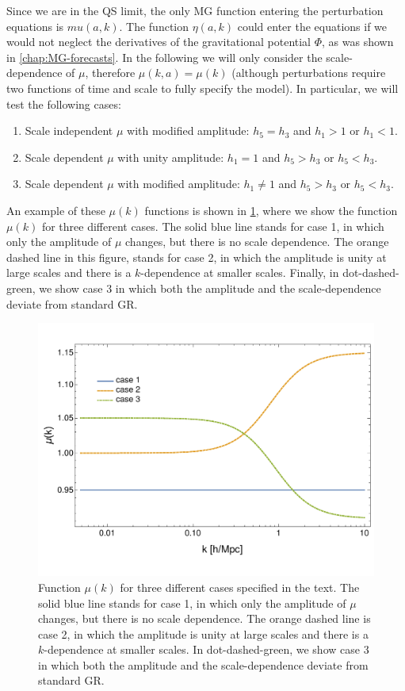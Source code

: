 Since we are in the QS limit, the only MG function entering the perturbation equations
is $mu(a,k)$. The function $\eta(a,k)$ could enter the equations
if we would not neglect the derivatives of the gravitational potential $\Phi$, as 
was shown in \cref{chap:MG-forecasts}.
In the following we will only consider the scale-dependence of $\mu$, therefore $\mu(k,a)=\mu(k)$ (although perturbations require
two functions of time and scale to fully specify the model). In particular,
we will test the following cases: 
\begin{enumerate} \label{enum:enumeration-cases}
	\item Scale independent $\mu$ with modified amplitude: $h_{5}=h_{3}$ and
	$h_{1}>1$ or $h_{1}<1$. 
	\item Scale dependent $\mu$ with unity amplitude: $h_{1}=1$ and $h_{5}>h_{3}$
	or $h_{5}<h_{3}$. 
	\item Scale dependent $\mu$ with modified amplitude: $h_{1}\neq1$ and
	$h_{5}>h_{3}\mbox{ or }h_{5}<h_{3}$. 
\end{enumerate}
An example of these $\mu(k)$ functions is shown in \cref{fig:Mu(k)function}, where we show the 
function $\mu(k)$ for three different cases. The solid blue line stands for case 1, in which only the amplitude of
$\mu$ changes, but there is no scale dependence. The orange dashed line in this figure, stands for case 2, 
in which the amplitude is unity at large scales and there is a $k$-dependence at smaller scales. 
Finally, in dot-dashed-green, we show case 3 in which both the amplitude and the scale-dependence deviate from standard GR.
\begin{figure}[htbp]
	\centering
	\includegraphics[width=0.75\linewidth]{Chapters/resummation-plots/mu-of-k-plots-3cases.pdf}
	\caption[MG function $\mu(k)$]{Function $\mu(k)$ for three different cases specified in the text. The solid blue line stands for case 1, in which only the amplitude of
	$\mu$ changes, but there is no scale dependence. The orange dashed line is case 2, 
in which the amplitude is unity at large scales and there is a $k$-dependence at smaller scales. In dot-dashed-green, we show case 3 in which both the amplitude and the scale-dependence deviate from standard GR.}
	\label{fig:Mu(k)function}
\end{figure}

